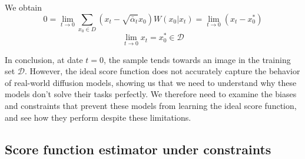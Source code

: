 \documentclass[a4paper,10pt]{article}
\theoremstyle{definition} %
\theoremstyle{definition} %
\theoremstyle{definition} %
\theoremstyle{definition} %
\newcommand{\0}{\boldsymbol{0}}
\begin{document}
We obtain
\[
0 = \lim\limits_{t \to 0} \sum\limits_{x_0 \in D} (x_t - \sqrt{\bar{\alpha}_t} x_0) W(x_0 | x_t) = \lim\limits_{t \to 0} (x_t - x_0^*)
\]
\begin{equation*}
    \lim\limits_{t\rightarrow 0} x_t = x_0^* \in \mathcal{D}
\end{equation*}

In conclusion, at date $t = 0$, the sample tends towards an image in the training set $\mathcal{D}$. However, the ideal score function does not accurately capture the behavior of real-world diffusion models, showing us that we need to understand why these models don't solve their tasks perfectly. We therefore need to examine the biases and constraints that prevent these models from learning the ideal score function, and see how they perform despite these limitations.
\subsection{Score function estimator under constraints}
\end{document}
